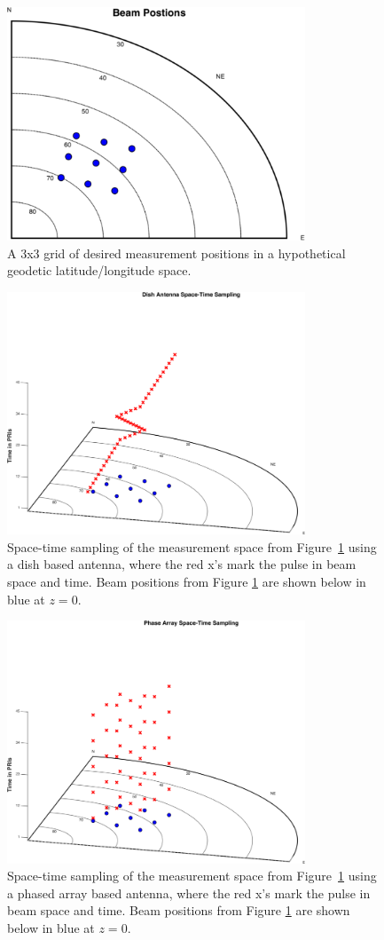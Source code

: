 \begin{figure}
	\centering
	\includegraphics[width=3.5in]{beampositionssts}
	\caption{A 3x3 grid of desired measurement positions in a
         hypothetical geodetic latitude/longitude space. }
	\label{fig:bp1}
\end{figure}

\begin{figure}
	\centering
	\includegraphics[width=3.5in]{dishsts}
	\caption{Space-time sampling of the measurement space from Figure~\ref{fig:bp1} using a dish based antenna, where the red x's mark the pulse in beam space and time. Beam positions from Figure \ref{fig:bp1} are shown below in blue at $z=0$.}	
	\label{fig:dbsts}
\end{figure}

\begin{figure}
	\centering
	\includegraphics[width=3.5in]{phasedarraysts}
	\caption{Space-time sampling of the measurement space from Figure~\ref{fig:bp1} using a phased array based antenna, where the red x's mark the pulse in beam space and time. Beam positions from Figure \ref{fig:bp1} are shown below in blue at $z=0$.}	
	\label{fig:phbsts}
\end{figure}

